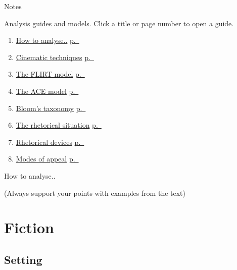 \documentclass[11pt,a4paper,oneside]{book}
\begin{document}
\clearpage{}
{\displayfont\color{navy}\fontsize{30}{34}\selectfont Notes\par}\vspace{6mm}
Analysis guides and models. Click a title or page number to open a guide.\par
\begin{enumerate}
\item \hyperref[note-how-to-analyse]{How to analyse..} \hfill \hyperref[note-how-to-analyse]{p.~\pageref*{note-how-to-analyse}}
\item \hyperref[note-cinematic-techniques]{Cinematic techniques} \hfill \hyperref[note-cinematic-techniques]{p.~\pageref*{note-cinematic-techniques}}
\item \hyperref[note-flirt-model]{The FLIRT model} \hfill \hyperref[note-flirt-model]{p.~\pageref*{note-flirt-model}}
\item \hyperref[note-ace-model]{The ACE model} \hfill \hyperref[note-ace-model]{p.~\pageref*{note-ace-model}}
\item \hyperref[note-blooms-taxonomy]{Bloom's taxonomy} \hfill \hyperref[note-blooms-taxonomy]{p.~\pageref*{note-blooms-taxonomy}}
\item \hyperref[note-rhetorical-situation]{The rhetorical situation} \hfill \hyperref[note-rhetorical-situation]{p.~\pageref*{note-rhetorical-situation}}
\item \hyperref[note-rhetorical-devices]{Rhetorical devices} \hfill \hyperref[note-rhetorical-devices]{p.~\pageref*{note-rhetorical-devices}}
\item \hyperref[note-modes-of-appeal]{Modes of appeal} \hfill \hyperref[note-modes-of-appeal]{p.~\pageref*{note-modes-of-appeal}}
\end{enumerate}

\clearpage{}\label{note-how-to-analyse}
{\displayfont\color{navy}\fontsize{30}{34}\selectfont How to analyse..\par}\vspace{4mm}
(Always support your points with examples from the text)


\section*{Fiction}

\subsection*{Setting}
\end{document}
